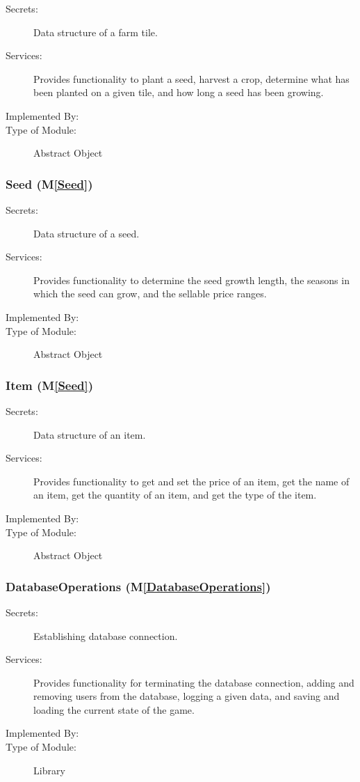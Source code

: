 \documentclass[12pt, titlepage]{article}
\newcommand{\mref}[1]{M\ref{#1}}
\begin{document}
\begin{description}
\item[Secrets:] Data structure of a farm tile.
\item[Services:] Provides functionality to plant a seed, harvest a crop, determine what has been planted on a given tile, and how long a seed has been growing.
\item[Implemented By:]  \progname
\item[Type of Module:] Abstract Object
\end{description}

\subsubsection{Seed (\mref{Seed})}

\begin{description}
\item[Secrets:] Data structure of a seed.
\item[Services:] Provides functionality to determine the seed growth length, the seasons in which the seed can grow, and the sellable price ranges.
\item[Implemented By:]  \progname
\item[Type of Module:] Abstract Object
\end{description}

\subsubsection{Item (\mref{Seed})}

\begin{description}
\item[Secrets:] Data structure of an item.
\item[Services:] Provides functionality to get and set the price of an item, get the name of an item, get the quantity of an item, and get the type of the item.
\item[Implemented By:]  \progname
\item[Type of Module:] Abstract Object
\end{description}

\subsubsection{DatabaseOperations (\mref{DatabaseOperations})}

\begin{description}
\item[Secrets:] Establishing database connection.
\item[Services:] Provides functionality for terminating the database connection, adding and removing users from the database, logging a given data, and saving and loading the current state of the game.
\item[Implemented By:]  \progname
\item[Type of Module:] Library
\end{description}
\end{document}
